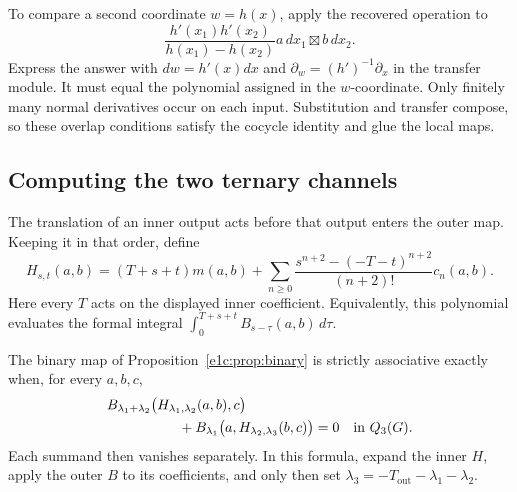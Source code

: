 To compare a second coordinate \(w=h(x)\), apply the recovered
operation to
\[
 \frac{h'(x_1)h'(x_2)}{h(x_1)-h(x_2)}
                    a\,dx_1\boxtimes b\,dx_2.
\]
Express the answer with \(dw=h'(x)dx\) and
\(\partial_w=(h')^{-1}\partial_x\) in the transfer module.
It must equal the polynomial assigned in the \(w\)-coordinate.
Only finitely many normal derivatives occur on each input.
Substitution and transfer compose, so these overlap conditions
satisfy the cocycle identity and glue the local maps.

\subsection{Computing the two ternary channels}

The translation of an inner output acts before that output
enters the outer map. Keeping it in that order, define
\begin{equation}\label{e1c:eq:H}
 H_{s,t}(a,b)=(T+s+t)m(a,b)
 +\sum_{n\geq0}
   \frac{s^{n+2}-(-T-t)^{n+2}}{(n+2)!}c_n(a,b).
\end{equation}
Here every \(T\) acts on the displayed inner coefficient.
Equivalently, this polynomial evaluates the formal integral
\(\int_0^{T+s+t}B_{s-\tau}(a,b)\,d\tau\).

\begin{theorem}\label{e1c:thm:criterion}
The binary map of Proposition~\ref{e1c:prop:binary} is strictly
associative exactly when, for every \(a,b,c\),
\begin{equation}\label{e1c:eq:criterion}
 \begin{aligned}
 &B_{\lambda_1+\lambda_2}
       \bigl(H_{\lambda_1,\lambda_2}(a,b),c\bigr)\\
 &\hspace{18mm}
   +B_{\lambda_1}\bigl(a,H_{\lambda_2,\lambda_3}(b,c)\bigr)=0
                      \quad\text{in }Q_3(G).
 \end{aligned}
\end{equation}
Each summand then vanishes separately. In this formula, expand
the inner \(H\), apply the outer \(B\) to its coefficients,
and only then set
\(\lambda_3=-T_{\mathrm{out}}-\lambda_1-\lambda_2\).
\end{theorem}

